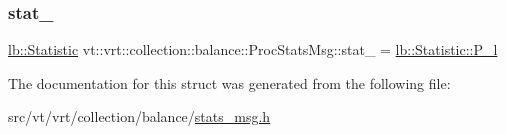 \subsubsection{\texorpdfstring{stat\+\_\+}{stat\_}}
{\footnotesize\ttfamily \hyperlink{namespacevt_1_1vrt_1_1collection_1_1lb_af0e20ef9afee77295053aa83bf1348b1}{lb\+::\+Statistic} vt\+::vrt\+::collection\+::balance\+::\+Proc\+Stats\+Msg\+::stat\+\_\+ = \hyperlink{namespacevt_1_1vrt_1_1collection_1_1lb_af0e20ef9afee77295053aa83bf1348b1af76181d80de89c5736a21709e19caa61}{lb\+::\+Statistic\+::\+P\+\_\+l}}



The documentation for this struct was generated from the following file\+:\begin{DoxyCompactItemize}
\item 
src/vt/vrt/collection/balance/\hyperlink{stats__msg_8h}{stats\+\_\+msg.\+h}\end{DoxyCompactItemize}

